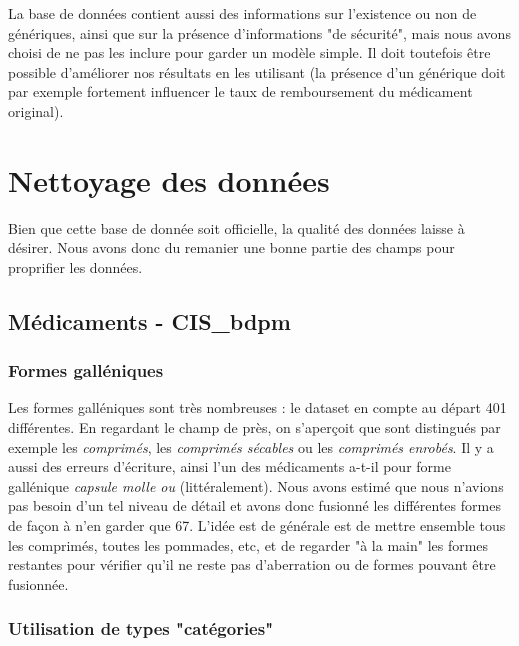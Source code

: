 \documentclass[a4paper, 12pt]{article}
\begin{document}
\smallskip

La base de données contient aussi des informations sur l'existence ou non de génériques, ainsi que sur la présence d'informations "de sécurité", mais nous avons choisi de ne pas les inclure pour garder un modèle simple. Il doit toutefois être possible d'améliorer nos résultats en les utilisant (la présence d'un générique doit par exemple fortement influencer le taux de remboursement du médicament original).

\section{Nettoyage des données}

Bien que cette base de donnée soit officielle, la qualité des données laisse à désirer. Nous avons donc du remanier une bonne partie des champs pour proprifier les données.

\subsection{Médicaments - CIS\_bdpm}

\subsubsection*{Formes galléniques}

Les formes galléniques sont très nombreuses : le dataset en compte au départ 401 différentes. En regardant le champ de près, on s'aperçoit que sont distingués par exemple les \textit{comprimés}, les \textit{comprimés sécables} ou les \textit{comprimés enrobés}. Il y a aussi des erreurs d'écriture, ainsi l'un des médicaments a-t-il pour forme gallénique \textit{capsule molle ou} (littéralement). Nous avons estimé que nous n'avions pas besoin d'un tel niveau de détail et avons donc fusionné les différentes formes de façon à n'en garder que 67. L'idée est de générale est de mettre ensemble tous les comprimés, toutes les pommades, etc, et de regarder "à la main" les formes restantes pour vérifier qu'il ne reste pas d'aberration ou de formes pouvant être fusionnée.

\subsubsection*{Utilisation de types "catégories"}
\end{document}
